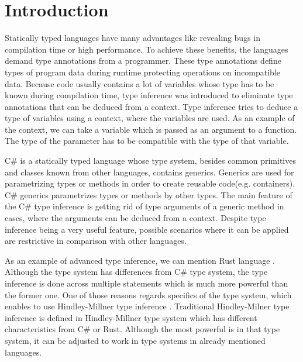 \chapter*{Introduction}

Statically typed languages have many advantages like revealing bugs in compilation time or high performance.
To achieve these benefits, the languages demand type annotations from a programmer.
These type annotations define types of program data during runtime protecting operations on incompatible data.
Because code usually contains a lot of variables whose type has to be known during compilation time, type inference was introduced to eliminate type annotations that can be deduced from a context.
Type inference tries to deduce a type of variables using a context, where the variables are used.
As an example of the context, we can take a variable which is passed as an argument to a function. 
The type of the parameter has to be compatible with the type of that variable.

C\# is a statically typed language whose type system, besides common primitives and classes known from other languages, contains generics.
Generics are used for parametrizing types or methods in order to create reusable code(e.g. containers).
C\# generics parametrizes types or methods by other types.
The main feature of the C\# type inference is getting rid of type arguments of a generic method in cases, where the arguments can be deduced from a context.
Despite type inference being a very useful feature, possible scenarios where it can be applied are restrictive in comparison with other languages.

As an example of advanced type inference, we can mention Rust language \cite{online:rustTypeInference}.
Although the type system has differences from C\# type system, the type inference is done across multiple statements which is much more powerful than the former one.
One of those reasons regards specifics of the type system, which enables to use Hindley-Millner type inference \cite{online:yHM}.
Traditional Hindley-Milner type inference is defined in Hindley-Millner type system \cite{online:wikiHM} which has different characteristics from C\# or Rust.
Although the most powerful is in that type system, it can be adjusted to work in type systems in already mentioned languages.

